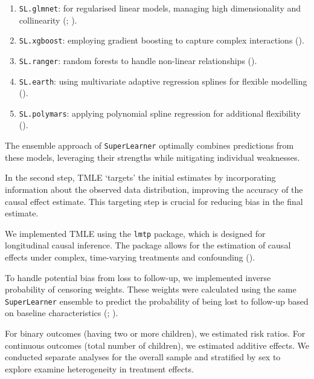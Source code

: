 \documentclass[
  single column]{article}
\providecommand{\tightlist}{%
  \setlength{\itemsep}{0pt}\setlength{\parskip}{0pt}}\usepackage{longtable,booktabs,array}
\begin{document}
\begin{enumerate}
\def\labelenumi{\arabic{enumi}.}
\tightlist
\item
  \texttt{SL.glmnet}: for regularised linear models, managing high
  dimensionality and collinearity
  (;
  ).
\item
  \texttt{SL.xgboost}: employing gradient boosting to capture complex
  interactions ().
\item
  \texttt{SL.ranger}: random forests to handle non-linear relationships
  ().
\item
  \texttt{SL.earth}: using multivariate adaptive regression splines for
  flexible modelling ().
\item
  \texttt{SL.polymars}: applying polynomial spline regression for
  additional flexibility ().
\end{enumerate}

The ensemble approach of \texttt{SuperLearner} optimally combines
predictions from these models, leveraging their strengths while
mitigating individual weaknesses.

In the second step, TMLE `targets' the initial estimates by
incorporating information about the observed data distribution,
improving the accuracy of the causal effect estimate. This targeting
step is crucial for reducing bias in the final estimate.

We implemented TMLE using the \texttt{lmtp} package, which is designed
for longitudinal causal inference. The package allows for the estimation
of causal effects under complex, time-varying treatments and confounding
().

To handle potential bias from loss to follow-up, we implemented inverse
probability of censoring weights. These weights were calculated using
the same \texttt{SuperLearner} ensemble to predict the probability of
being lost to follow-up based on baseline characteristics
(;
).

For binary outcomes (having two or more children), we estimated risk
ratios. For continuous outcomes (total number of children), we estimated
additive effects. We conducted separate analyses for the overall sample
and stratified by sex to explore examine heterogeneity in treatment
effects.
\end{document}
